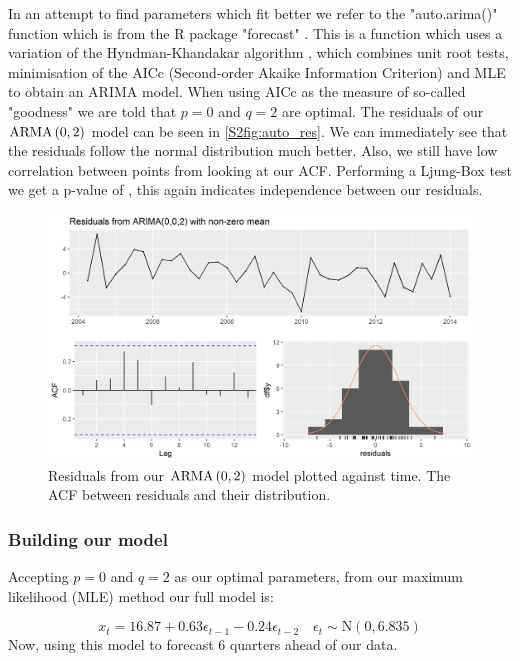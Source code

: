 In an attempt to find parameters which fit better we refer to the "auto.arima()" function which is from the R package "forecast" \cite{forecast}. This is a function which uses a variation of the Hyndman-Khandakar algorithm \cite{hyndman2008automatic}, which combines unit root tests, minimisation of the AICc (Second-order Akaike Information Criterion) and MLE to obtain an ARIMA model.
\nline
When using AICc as the measure of so-called "goodness" we are told that $p=0$ and $q=2$ are optimal. The residuals of our $\text{ARMA}\left(0,2\right)$ model can be seen in \autoref{S2fig:auto_res}. We can immediately see that the residuals follow the normal distribution much better. Also, we still have low correlation between points from looking at our ACF. Performing a Ljung-Box test we get a p-value of , this again indicates independence between our residuals.

\begin{figure}[H]
    \centering
    \includegraphics[width=\sTwoRes\textwidth]{Sections/ARIMA/Plots/auto_res.png}
    \caption{Residuals from our $\text{ARMA}\left(0,2\right)$ model plotted against time. The ACF between residuals and their distribution.}
    \label{S2fig:auto_res}
\end{figure}

\subsubsection{Building our model}

Accepting $p=0$ and $q=2$ as our optimal parameters, from our maximum likelihood (MLE) method our full model is:

\begin{equation*}
    x_t = 16.87 + 0.63\epsilon_{t-1} - 0.24\epsilon_{t-2} \quad \epsilon_t \sim \text{N}\left(0, 6.835\right)
\end{equation*}
\nline
Now, using this model to forecast 6 quarters ahead of our data.


